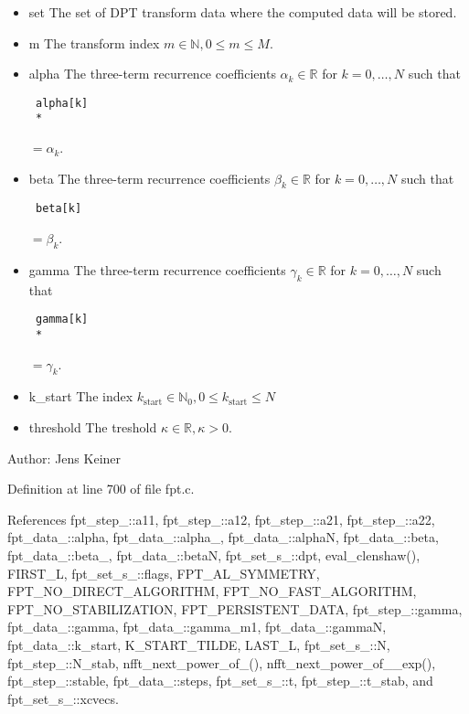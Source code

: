 \begin{itemize}
\item set The set of DPT transform data where the computed data will be stored. \item m The transform index $m \in \mathbb{N}, 0 \le m \le M$. \item alpha The three-term recurrence coefficients $\alpha_k \in \mathbb{R}$ for $k=0,\ldots,N$ such that 

\footnotesize\begin{verbatim} alpha[k]
 *      \end{verbatim}
\normalsize
 $=\alpha_k$. \item beta The three-term recurrence coefficients $\beta_k \in \mathbb{R}$ for $k=0,\ldots,N$ such that 

\footnotesize\begin{verbatim} beta[k] \end{verbatim}
\normalsize
 $=\beta_k$. \item gamma The three-term recurrence coefficients $\gamma_k \in \mathbb{R}$ for $k=0,\ldots,N$ such that 

\footnotesize\begin{verbatim} gamma[k]
 *            \end{verbatim}
\normalsize
 $=\gamma_k$. \item k\_\-start The index $k_{\text{start}} \in \mathbb{N}_0, 0 \le k_{\text{start}} \le N$ \item threshold The treshold $\kappa \in \mathbb{R}, \kappa > 0$.\end{itemize}
\begin{Desc}
\item[Author:]Jens Keiner \end{Desc}


Definition at line 700 of file fpt.c.

References fpt\_\-step\_\-::a11, fpt\_\-step\_\-::a12, fpt\_\-step\_\-::a21, fpt\_\-step\_\-::a22, fpt\_\-data\_\-::alpha, fpt\_\-data\_\-::alpha\_, fpt\_\-data\_\-::alpha\-N, fpt\_\-data\_\-::beta, fpt\_\-data\_\-::beta\_, fpt\_\-data\_\-::beta\-N, fpt\_\-set\_\-s\_\-::dpt, eval\_\-clenshaw(), FIRST\_\-L, fpt\_\-set\_\-s\_\-::flags, FPT\_\-AL\_\-SYMMETRY, FPT\_\-NO\_\-DIRECT\_\-ALGORITHM, FPT\_\-NO\_\-FAST\_\-ALGORITHM, FPT\_\-NO\_\-STABILIZATION, FPT\_\-PERSISTENT\_\-DATA, fpt\_\-step\_\-::gamma, fpt\_\-data\_\-::gamma, fpt\_\-data\_\-::gamma\_\-m1, fpt\_\-data\_\-::gamma\-N, fpt\_\-data\_\-::k\_\-start, K\_\-START\_\-TILDE, LAST\_\-L, fpt\_\-set\_\-s\_\-::N, fpt\_\-step\_\-::N\_\-stab, nfft\_\-next\_\-power\_\-of\_(), nfft\_\-next\_\-power\_\-of\_\_\-exp(), fpt\_\-step\_\-::stable, fpt\_\-data\_\-::steps, fpt\_\-set\_\-s\_\-::t, fpt\_\-step\_\-::t\_\-stab, and fpt\_\-set\_\-s\_\-::xcvecs.

